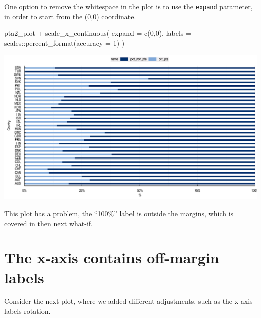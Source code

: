 \documentclass[
  11pt,
  oneside]{report}
\newenvironment{Shaded}{\begin{snugshade}}{\end{snugshade}}
\newcommand{\AttributeTok}[1]{\textcolor[rgb]{0.77,0.63,0.00}{#1}}
\newcommand{\DecValTok}[1]{\textcolor[rgb]{0.00,0.00,0.81}{#1}}
\newcommand{\FunctionTok}[1]{\textcolor[rgb]{0.00,0.00,0.00}{#1}}
\newcommand{\NormalTok}[1]{#1}
\newcommand{\SpecialCharTok}[1]{\textcolor[rgb]{0.00,0.00,0.00}{#1}}
\begin{document}
One option to remove the whitespace in the plot is to use the
\texttt{expand} parameter, in order to start from the (0,0) coordinate.

\begin{Shaded}
\begin{Highlighting}[]
\NormalTok{pta2\_plot }\SpecialCharTok{+} 
  \FunctionTok{scale\_x\_continuous}\NormalTok{(}
    \AttributeTok{expand =} \FunctionTok{c}\NormalTok{(}\DecValTok{0}\NormalTok{,}\DecValTok{0}\NormalTok{),}
    \AttributeTok{labels =}\NormalTok{ scales}\SpecialCharTok{::}\FunctionTok{percent\_format}\NormalTok{(}\AttributeTok{accuracy =} \DecValTok{1}\NormalTok{)}
\NormalTok{  )}
\end{Highlighting}
\end{Shaded}

\begin{center}\includegraphics{book_figures/whatif_whitespace_2-1} \end{center}

This plot has a problem, the ``100\%'' label is outside the margins,
which is covered in then next what-if.

\hypertarget{the-x-axis-contains-off-margin-labels}{%
\section{The x-axis contains off-margin
labels}\label{the-x-axis-contains-off-margin-labels}}

Consider the next plot, where we added different adjustments, such as
the x-axis labels rotation.
\end{document}
